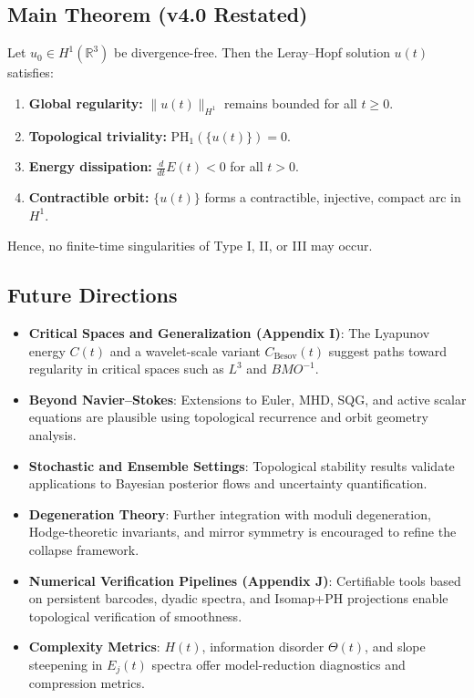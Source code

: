 \documentclass[11pt]{article}
\theoremstyle{definition}
\begin{document}
\subsection*{Main Theorem (v4.0 Restated)}

Let $u_0 \in H^1(\mathbb{R}^3)$ be divergence-free. Then the Leray–Hopf solution $u(t)$ satisfies:

\begin{enumerate}
    \item \textbf{Global regularity:} $\|u(t)\|_{H^1}$ remains bounded for all $t \geq 0$.
    \item \textbf{Topological triviality:} $\mathrm{PH}_1(\{u(t)\}) = 0$.
    \item \textbf{Energy dissipation:} $\frac{d}{dt}E(t) < 0$ for all $t > 0$.
    \item \textbf{Contractible orbit:} $\{u(t)\}$ forms a contractible, injective, compact arc in $H^1$.
\end{enumerate}

Hence, no finite-time singularities of Type I, II, or III may occur.

\subsection*{Future Directions}

\begin{itemize}
    \item \textbf{Critical Spaces and Generalization (Appendix I)}: The Lyapunov energy $C(t)$ and a wavelet-scale variant $C_{\text{Besov}}(t)$ suggest paths toward regularity in critical spaces such as $L^3$ and $BMO^{-1}$.

    \item \textbf{Beyond Navier–Stokes}: Extensions to Euler, MHD, SQG, and active scalar equations are plausible using topological recurrence and orbit geometry analysis.

    \item \textbf{Stochastic and Ensemble Settings}: Topological stability results validate applications to Bayesian posterior flows and uncertainty quantification.

    \item \textbf{Degeneration Theory}: Further integration with moduli degeneration, Hodge-theoretic invariants, and mirror symmetry is encouraged to refine the collapse framework.

    \item \textbf{Numerical Verification Pipelines (Appendix J)}: Certifiable tools based on persistent barcodes, dyadic spectra, and Isomap+PH projections enable topological verification of smoothness.

    \item \textbf{Complexity Metrics}: $H(t)$, information disorder $\Theta(t)$, and slope steepening in $E_j(t)$ spectra offer model-reduction diagnostics and compression metrics.
\end{itemize}
\end{document}
